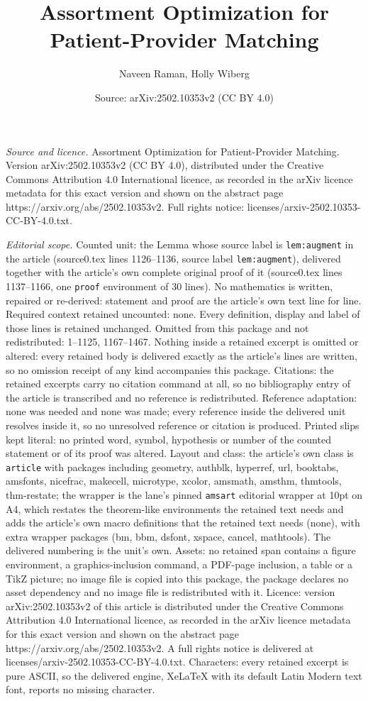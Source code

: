 \documentclass[10pt,a4paper]{amsart}
\title[Assortment Optimization for Patient-Provider Matching]{Assortment Optimization for Patient-Provider Matching}
\author{Naveen Raman, Holly Wiberg}
\date{Source: arXiv:2502.10353v2 (CC BY 4.0)}
\begin{document}
\maketitle

\noindent\emph{Source and licence.} Assortment Optimization for Patient-Provider Matching. Version arXiv:2502.10353v2 (CC BY 4.0), distributed under the Creative Commons Attribution 4.0 International licence, as recorded in the arXiv licence metadata for this exact version and shown on the abstract page https://arxiv.org/abs/2502.10353v2. Full rights notice: licenses/arxiv-2502.10353-CC-BY-4.0.txt.\par\smallskip

\noindent\textit{Editorial scope.} Counted unit: the Lemma whose source label is \texttt{lem:augment} in the article (source0.tex lines 1126--1136, source label \texttt{lem:augment}), delivered together with the article's own complete original proof of it (source0.tex lines 1137--1166, one \texttt{proof} environment of 30 lines). No mathematics is written, repaired or re-derived: statement and proof are the article's own text line for line. Required context retained uncounted: none. Every definition, display and label of those lines is retained unchanged. Omitted from this package and not redistributed: 1--1125, 1167--1467. Nothing inside a retained excerpt is omitted or altered: every retained body is delivered exactly as the article's lines are written, so no omission receipt of any kind accompanies this package. Citations: the retained excerpts carry no citation command at all, so no bibliography entry of the article is transcribed and no reference is redistributed. Reference adaptation: none was needed and none was made; every reference inside the delivered unit resolves inside it, so no unresolved reference or citation is produced. Printed slips kept literal: no printed word, symbol, hypothesis or number of the counted statement or of its proof was altered. Layout and class: the article's own class is \texttt{article} with packages including geometry, authblk, hyperref, url, booktabs, amsfonts, nicefrac, makecell, microtype, xcolor, amsmath, amsthm, thmtools, thm-restate; the wrapper is the lane's pinned \texttt{amsart} editorial wrapper at 10pt on A4, which restates the theorem-like environments the retained text needs and adds the article's own macro definitions that the retained text needs (none), with extra wrapper packages (bm, bbm, dsfont, xspace, cancel, mathtools). The delivered numbering is the unit's own. Assets: no retained span contains a figure environment, a graphics-inclusion command, a PDF-page inclusion, a table or a TikZ picture; no image file is copied into this package, the package declares no asset dependency and no image file is redistributed with it. Licence: version arXiv:2502.10353v2 of this article is distributed under the Creative Commons Attribution 4.0 International licence, as recorded in the arXiv licence metadata for this exact version and shown on the abstract page https://arxiv.org/abs/2502.10353v2. A full rights notice is delivered at licenses/arxiv-2502.10353-CC-BY-4.0.txt. Characters: every retained excerpt is pure ASCII, so the delivered engine, XeLaTeX with its default Latin Modern text font, reports no missing character.
\end{document}
